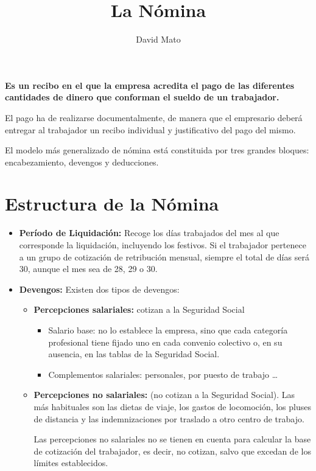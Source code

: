 \documentclass{article}
\title{La Nómina}
\author{David Mato}
\date{} %
\begin{document}
	
	\maketitle %
	
	\textbf{Es un recibo en el que la empresa acredita el pago de las diferentes cantidades de dinero que conforman el sueldo de un trabajador.}
	
	El pago ha de realizarse documentalmente, de manera que el empresario deberá entregar al trabajador un recibo individual y justificativo del pago del mismo.
	
	El modelo más generalizado de nómina está constituida por tres grandes bloques: encabezamiento, devengos y deducciones.
	
	\section*{Estructura de la Nómina}
	
	\begin{itemize}
		\item \textbf{Período de Liquidación:} Recoge los días trabajados del mes al que corresponde la liquidación, incluyendo los festivos. Si el trabajador pertenece a un grupo de cotización de retribución mensual, siempre el total de días será 30, aunque el mes sea de 28, 29 o 30.
		\item \textbf{Devengos:} Existen dos tipos de devengos:
		\begin{itemize}
			\item \textbf{Percepciones salariales:} cotizan a la Seguridad Social
			\begin{itemize}
				\item Salario base: no lo establece la empresa, sino que cada categoría profesional tiene fijado uno en cada convenio colectivo o, en su ausencia, en las tablas de la Seguridad Social.
				\item Complementos salariales: personales, por puesto de trabajo …
			\end{itemize}
			\item \textbf{Percepciones no salariales:} (no cotizan a la Seguridad Social). Las más habituales son las dietas de viaje, los gastos de locomoción, los pluses de distancia y las indemnizaciones por traslado a otro centro de trabajo.
			
			Las percepciones no salariales no se tienen en cuenta para calcular la base de cotización del trabajador, es decir, no cotizan, salvo que excedan de los límites establecidos.
		\end{itemize}
	\end{itemize}
	
\end{document}
